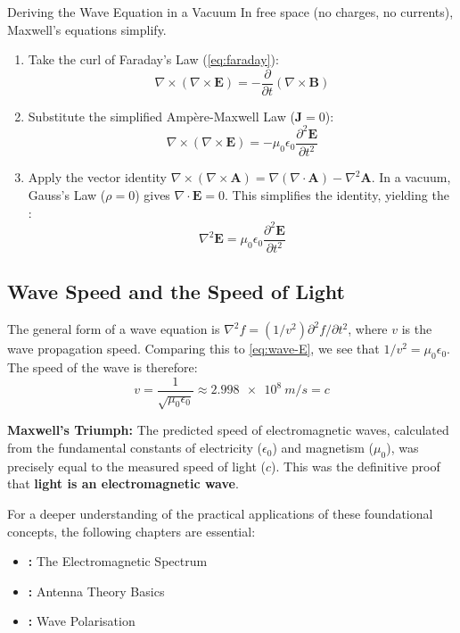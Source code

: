 \begin{workedexample}{Deriving the Wave Equation in a Vacuum}
In free space (no charges, no currents), Maxwell's equations simplify.
\begin{enumerate}
    \item Take the curl of Faraday's Law (\cref{eq:faraday}):
          \[ \nabla \times (\nabla \times \mathbf{E}) = -\frac{\partial}{\partial t}(\nabla \times \mathbf{B}) \]
    \item Substitute the simplified Ampère-Maxwell Law ($\mathbf{J}=0$):
          \[ \nabla \times (\nabla \times \mathbf{E}) = -\mu_0 \epsilon_0 \frac{\partial^2 \mathbf{E}}{\partial t^2} \]
    \item Apply the vector identity $\nabla \times (\nabla \times \mathbf{A}) = \nabla(\nabla \cdot \mathbf{A}) - \nabla^2 \mathbf{A}$. In a vacuum, Gauss's Law ($\rho=0$) gives $\nabla \cdot \mathbf{E} = 0$. This simplifies the identity, yielding the :
          \begin{equation}
              \nabla^2 \mathbf{E} = \mu_0 \epsilon_0 \frac{\partial^2 \mathbf{E}}{\partial t^2}
              \label{eq:wave-E}
          \end{equation}
\end{enumerate}
\end{workedexample}

\subsection{Wave Speed and the Speed of Light}
The general form of a wave equation is $\nabla^2 f = (1/v^2) \partial^2 f/\partial t^2$, where $v$ is the wave propagation speed. Comparing this to \cref{eq:wave-E}, we see that $1/v^2 = \mu_0 \epsilon_0$. The speed of the wave is therefore:
\begin{equation}
v = \frac{1}{\sqrt{\mu_0 \epsilon_0}} \approx \SI{2.998e8}{m/s} = c
\label{eq:speed-of-light}
\end{equation}

\begin{keyconcept}
    \textbf{Maxwell's Triumph:} The predicted speed of electromagnetic waves, calculated from the fundamental constants of electricity ($\epsilon_0$) and magnetism ($\mu_0$), was precisely equal to the measured speed of light ($c$). This was the definitive proof that \textbf{light is an electromagnetic wave}.
\end{keyconcept}

\begin{importantbox}
    For a deeper understanding of the practical applications of these foundational concepts, the following chapters are essential:
    \begin{itemize}
        \item \textbf{:} The Electromagnetic Spectrum
        \item \textbf{:} Antenna Theory Basics
        \item \textbf{:} Wave Polarisation
    \end{itemize}
\end{importantbox}